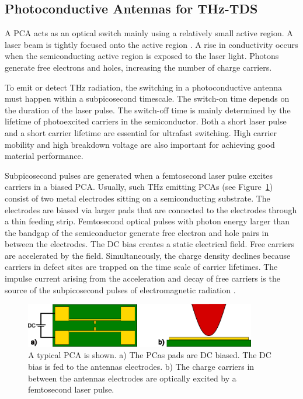 \subsection{Photoconductive Antennas for THz-TDS}
A PCA acts as an optical switch mainly using a relatively small active region. A laser beam is tightly focused onto the active region \cite{nandiErAsInAlGaAsPhotoconductors2021}. A rise in conductivity occurs when the semiconducting active region is exposed to the laser light. Photons generate free electrons and holes, increasing the number of charge carriers.

To emit or detect THz radiation, the switching in a photoconductive antenna must happen within a subpicosecond timescale. The switch-on time depends on the duration of the laser pulse. The switch-off time is mainly determined by the lifetime of photoexcited carriers in the semiconductor. Both a short laser pulse and a short carrier lifetime are essential for ultrafast switching. High carrier mobility and high breakdown voltage are also important for achieving good material performance.

Subpicosecond pulses are generated when a femtosecond laser pulse excites carriers in a biased PCA. Usually, such THz emitting PCAs (see Figure~\ref{typPCA}) consist of two metal electrodes sitting on a semiconducting substrate. The electrodes are biased via larger pads that are connected to the electrodes through a thin feeding strip. Femtosecond optical pulses with photon energy larger than the bandgap of the semiconductor generate free electron and hole pairs in between the electrodes. The DC bias creates a static electrical field. Free carriers are accelerated by the field. Simultaneously, the charge density declines because carriers in defect sites are trapped on the time scale of carrier lifetimes. The impulse current arising from the acceleration and decay of free carriers is the source of the subpicosecond pulses of electromagnetic radiation \cite{PrinciplesTerahertzScience2009}. 

\begin{figure}
	\centering
	\includegraphics[width=0.9\textwidth]{figures/typiucal_PCA.pdf}
	\caption{A typical PCA is shown. a) The PCas pads are DC biased. The DC bias is fed to the antennas electrodes. b) The charge carriers in between the antennas electrodes are optically excited by a femtosecond laser pulse.}
	\label{typPCA}
\end{figure}

